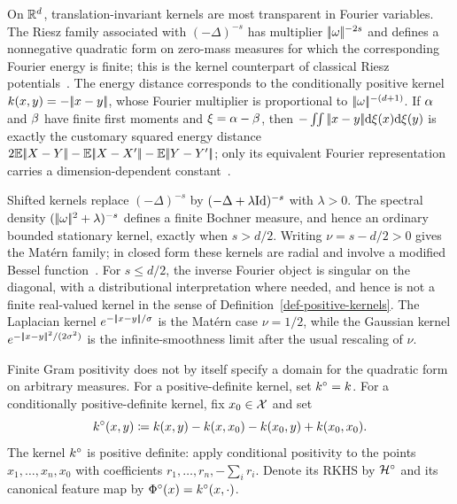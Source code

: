 \begin{example}
	On $\mathbb{R}^d$, translation-invariant kernels are most transparent in Fourier variables. The Riesz family associated with $(-\Delta)^{-s}$ has multiplier $|\!| \omega |\!|^{-2s}$ and defines a nonnegative quadratic form on zero-mass measures for which the corresponding Fourier energy is finite; this is the kernel counterpart of classical Riesz potentials~\cite{berg84harmonic}. The energy distance corresponds to the conditionally positive kernel $k(x,y)=-|\!| x-y |\!|$, whose Fourier multiplier is proportional to $|\!| \omega |\!|^{-(d+1)}$. If $\alpha$ and $\beta$ have finite first moments and $\xi=\alpha-\beta$, then
	$-\iint|\!| x-y |\!|\mathrm{d}\xi(x)\mathrm{d}\xi(y)$ is exactly the customary squared energy distance
	$2\mathbb{E}|\!| X-Y |\!|-\mathbb{E}|\!| X-X' |\!|-\mathbb{E}|\!| Y-Y' |\!|$; only its equivalent Fourier representation carries a dimension-dependent constant~\cite{schoenberg38,szekely2004testing}.

Shifted kernels replace $(-\Delta)^{-s}$ by $(-\Delta+\lambda\mathrm{Id})^{-s}$ with $\lambda>0$. The spectral density $(|\!| \omega |\!|^2+\lambda)^{-s}$ defines a finite Bochner measure, and hence an ordinary bounded stationary kernel, exactly when $s>d/2$. Writing $\nu=s-d/2>0$ gives the Mat\'ern family; in closed form these kernels are radial and involve a modified Bessel function~\cite{wendland2005scattered}. For $s\leq d/2$, the inverse Fourier object is singular on the diagonal, with a distributional interpretation where needed, and hence is not a finite real-valued kernel in the sense of Definition~\ref{def-positive-kernels}. The Laplacian kernel $e^{-|\!| x-y |\!|/\sigma}$ is the Mat\'ern case $\nu=1/2$, while the Gaussian kernel $e^{-|\!| x-y |\!|^2/(2\sigma^2)}$ is the infinite-smoothness limit after the usual rescaling of $\nu$.
\end{example}

Finite Gram positivity does not by itself specify a domain for the quadratic form on arbitrary measures. For a positive-definite kernel, set $k^\circ=k$. For a conditionally positive-definite kernel, fix $x_0\in\mathcal{X}$ and set
\[
	k^\circ(x,y)
	\coloneqq
	k(x,y)-k(x,x_0)-k(x_0,y)+k(x_0,x_0).
\]
The kernel $k^\circ$ is positive definite: apply conditional positivity to the points $x_1,\ldots,x_n,x_0$ with coefficients $r_1,\ldots,r_n,-\sum_i r_i$. Denote its RKHS by $\mathcal{H}^\circ$ and its canonical feature map by $\Phi^\circ(x)=k^\circ(x,\cdot)$.

